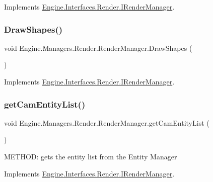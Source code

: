 Implements \hyperlink{a00458_a566b23b9d0b60e2fb06107e7a6c239cb}{Engine.\+Interfaces.\+Render.\+I\+Render\+Manager}.

\mbox{\label{a00526_af81e4faf42327afbf604c3bb4d09499a}} 
\subsubsection{\texorpdfstring{Draw\+Shapes()}{DrawShapes()}}
{\footnotesize\ttfamily void Engine.\+Managers.\+Render.\+Render\+Manager.\+Draw\+Shapes (\begin{DoxyParamCaption}{ }\end{DoxyParamCaption})\hspace{0.3cm}{\ttfamily [inline]}}



Implements \hyperlink{a00458_af785d8e5292f1f8f89c47d300e2c7d67}{Engine.\+Interfaces.\+Render.\+I\+Render\+Manager}.

\mbox{\label{a00526_a79fb84c735ca8b863eed41f51566f554}} 
\subsubsection{\texorpdfstring{get\+Cam\+Entity\+List()}{getCamEntityList()}}
{\footnotesize\ttfamily void Engine.\+Managers.\+Render.\+Render\+Manager.\+get\+Cam\+Entity\+List (\begin{DoxyParamCaption}{ }\end{DoxyParamCaption})\hspace{0.3cm}{\ttfamily [inline]}}



M\+E\+T\+H\+OD\+: gets the entity list from the Entity Manager 



Implements \hyperlink{a00458_a37f1fdeb82edc4e414404d43d1c6bb51}{Engine.\+Interfaces.\+Render.\+I\+Render\+Manager}.

